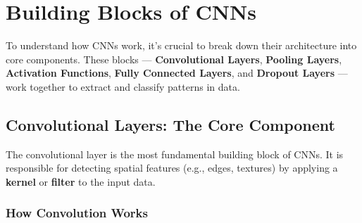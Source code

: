 \chapter{Building Blocks of CNNs}\label{chp:3}
To understand how CNNs work, it’s crucial to break down their architecture into core components. These blocks — \textbf{Convolutional Layers}, \textbf{Pooling Layers}, \textbf{Activation Functions}, \textbf{Fully Connected Layers}, and \textbf{Dropout Layers} — work together to extract and classify patterns in data.

\section{Convolutional Layers: The Core Component}
The convolutional layer is the most fundamental building block of CNNs. It is responsible for detecting spatial features (e.g., edges, textures) by applying a \textbf{kernel} or \textbf{filter} to the input data.

\subsection{How Convolution Works}